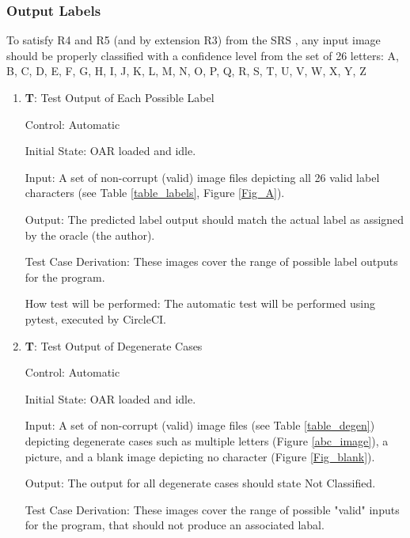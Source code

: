 \documentclass[12pt, titlepage]{article}
\newcounter{testnum} %
\begin{document}
\subsubsection{Output Labels}

To satisfy R4 and R5 (and by extension R3) from the SRS \citep{SRS}, any input image should be properly classified with a confidence level from the set of 26 letters: {A, B, C, D, E, F, G, H, I, J, K, L, M, N, O, P, Q, R, S, T, U, V, W, X, Y, Z}

\begin{enumerate}

  \item{\textbf{T\thetestnum \label{T_outputLabel}}: Test Output of Each Possible Label\\}
            
  Control: Automatic
            
  Initial State: OAR loaded and idle.
            
  Input: A set of non-corrupt (valid) image files depicting all 26 valid label characters (see Table \ref{table_labels}, Figure \ref{Fig_A}).
            
  Output: The predicted label output should match the actual label as assigned by the oracle (the author).

  Test Case Derivation: These images cover the range of possible label outputs for the program.
            
  How test will be performed: The automatic test will be performed using pytest, executed by CircleCI.

  \item{\textbf{T\thetestnum \label{T_outputDegen}}: Test Output of Degenerate Cases\\}
            
  Control: Automatic
            
  Initial State: OAR loaded and idle.
            
  Input: A set of non-corrupt (valid) image files (see Table \ref{table_degen}) depicting degenerate cases such as multiple letters (Figure \ref{abc_image}), a picture, and a blank image depicting no character (Figure \ref{Fig_blank}).
            
  Output: The output for all degenerate cases should state Not Classified.
            
  Test Case Derivation: These images cover the range of possible "valid" inputs for the program, that should not produce an associated labal.
            

\end{enumerate}
\end{document}
